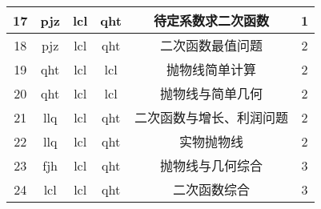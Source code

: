 \documentclass[11pt]{article}
\begin{document}
\begin{table}[htbp]
\begin{tabular}{cccccc}
    \midrule
    17          & pjz         & lcl         & qht         & 待定系数求二次函数   & 1 \\
    \midrule
    18          & pjz         & lcl         & qht         & 二次函数最值问题    & 2 \\
    \midrule
    19          & qht         & lcl         & lcl         & 抛物线简单计算     & 2 \\
    \midrule
    20          & qht         & lcl         & lcl         & 抛物线与简单几何    & 2 \\
    \midrule
    21          & llq         & lcl         & qht         & 二次函数与增长、利润问题 & 2 \\
    \midrule
    22          & llq         & lcl         & qht         & 实物抛物线       & 2 \\
    \midrule
    23          & fjh         & lcl         & qht         & 抛物线与几何综合    & 3 \\
    \midrule
    24          & lcl         & lcl         & qht         & 二次函数综合      & 3 \\
    \bottomrule
    \end{tabular}%
\end{table}%
\end{document}
